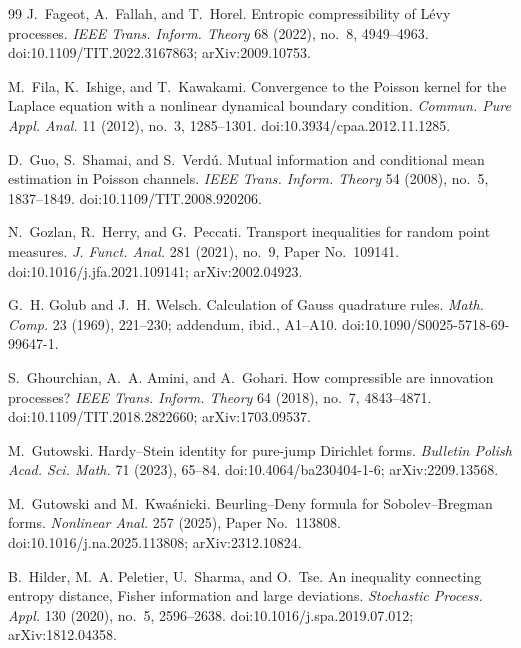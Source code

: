 \begin{thebibliography}{99}
J.~Fageot, A.~Fallah, and T.~Horel.
\newblock Entropic compressibility of L{\'e}vy processes.
\newblock \emph{IEEE Trans. Inform. Theory} 68 (2022), no.~8, 4949--4963.
\newblock doi:10.1109/TIT.2022.3167863; arXiv:2009.10753.

M.~Fila, K.~Ishige, and T.~Kawakami.
\newblock Convergence to the Poisson kernel for the Laplace equation with a
nonlinear dynamical boundary condition.
\newblock \emph{Commun. Pure Appl. Anal.} 11 (2012), no.~3, 1285--1301.
\newblock doi:10.3934/cpaa.2012.11.1285.

D.~Guo, S.~Shamai, and S.~Verd{\'u}.
\newblock Mutual information and conditional mean estimation in Poisson
channels.
\newblock \emph{IEEE Trans. Inform. Theory} 54 (2008), no.~5, 1837--1849.
\newblock doi:10.1109/TIT.2008.920206.

N.~Gozlan, R.~Herry, and G.~Peccati.
\newblock Transport inequalities for random point measures.
\newblock \emph{J. Funct. Anal.} 281 (2021), no.~9, Paper No.~109141.
\newblock doi:10.1016/j.jfa.2021.109141; arXiv:2002.04923.

G.~H. Golub and J.~H. Welsch.
\newblock Calculation of {G}auss quadrature rules.
\newblock \emph{Math. Comp.} 23 (1969), 221--230; addendum, ibid.,
A1--A10.
\newblock doi:10.1090/S0025-5718-69-99647-1.

S.~Ghourchian, A.~A. Amini, and A.~Gohari.
\newblock How compressible are innovation processes?
\newblock \emph{IEEE Trans. Inform. Theory} 64 (2018), no.~7, 4843--4871.
\newblock doi:10.1109/TIT.2018.2822660; arXiv:1703.09537.

M.~Gutowski.
\newblock Hardy--Stein identity for pure-jump Dirichlet forms.
\newblock \emph{Bulletin Polish Acad. Sci. Math.} 71 (2023), 65--84.
\newblock doi:10.4064/ba230404-1-6; arXiv:2209.13568.

M.~Gutowski and M.~Kwa{\'s}nicki.
\newblock Beurling--Deny formula for Sobolev--Bregman forms.
\newblock \emph{Nonlinear Anal.} 257 (2025), Paper No.~113808.
\newblock doi:10.1016/j.na.2025.113808; arXiv:2312.10824.

B.~Hilder, M.~A. Peletier, U.~Sharma, and O.~Tse.
\newblock An inequality connecting entropy distance, Fisher information and
large deviations.
\newblock \emph{Stochastic Process. Appl.} 130 (2020), no.~5, 2596--2638.
\newblock doi:10.1016/j.spa.2019.07.012; arXiv:1812.04358.


\end{thebibliography}
